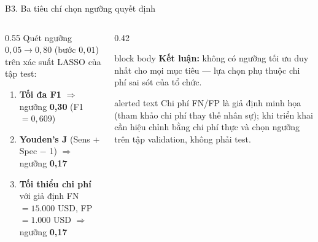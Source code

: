 \documentclass[10pt,aspectratio=169]{beamer}
\begin{document}
\begin{frame}{B3. Ba tiêu chí chọn ngưỡng quyết định}
  \begin{columns}[T,onlytextwidth]
    \begin{column}{0.55\textwidth}
      \small
      Quét ngưỡng $0{,}05 \to 0{,}80$ (bước $0{,}01$) trên xác suất LASSO
      của tập test:
      \vspace{0.15cm}
      \begin{enumerate}
        \item \textbf{Tối đa F1} $\Rightarrow$ ngưỡng \textbf{0,30}
              (F1 $= 0{,}609$)
        \item \textbf{Youden's J} (Sens + Spec $-$ 1) $\Rightarrow$
              ngưỡng \textbf{0,17}
        \item \textbf{Tối thiểu chi phí} với giả định
              FN $= 15.000$ USD, FP $= 1.000$ USD $\Rightarrow$
              ngưỡng \textbf{0,17}
      \end{enumerate}
    \end{column}
    \begin{column}{0.42\textwidth}
      \begin{beamercolorbox}[sep=0.16cm,rounded=true]{block body}
        \small
        \textbf{Kết luận:} không có ngưỡng tối ưu duy nhất cho mọi mục tiêu
        --- lựa chọn phụ thuộc chi phí sai sót của tổ chức.
      \end{beamercolorbox}
      \vspace{0.16cm}
      \begin{beamercolorbox}[sep=0.16cm,rounded=true]{alerted text}
        \small
        Chi phí FN/FP là giả định minh họa (tham khảo chi phí thay thế
        nhân sự); khi triển khai cần hiệu chỉnh bằng chi phí thực và chọn
        ngưỡng trên tập validation, không phải test.
      \end{beamercolorbox}
    \end{column}
  \end{columns}
\end{frame}
\end{document}
